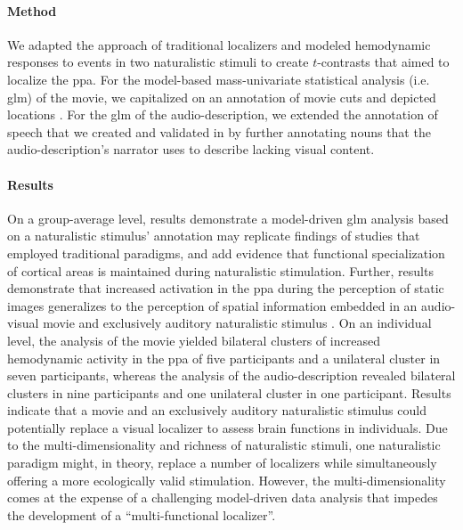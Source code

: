 \paragraph{Method}

We adapted the approach of traditional localizers and modeled hemodynamic
responses to events in two naturalistic stimuli to create $t$-contrasts that
aimed to localize the \ac{ppa}.
For the model-based mass-univariate statistical analysis (i.e. \ac{glm}) of the
movie, we capitalized on an annotation of movie cuts and depicted locations
\citep{haeusler2016cutanno}.
For the \ac{glm} of the audio-description, we extended the annotation of speech
that we created and validated in \citep{haeusler2021speechanno} by further
annotating nouns that the audio-description's narrator uses to describe lacking
visual content.


\paragraph{Results}

On a group-average level, results demonstrate a model-driven \ac{glm} analysis
based on a naturalistic stimulus' annotation may replicate findings of studies
that employed traditional paradigms, and add evidence
\citep[cf.][]{bartels2004mapping} that functional specialization of cortical
areas is maintained during naturalistic stimulation.
Further, results demonstrate that increased activation in the \ac{ppa} during
the perception of static images generalizes to the perception of spatial
information embedded in an audio-visual movie and exclusively auditory
naturalistic stimulus \citep{haeusler2022processing}.
On an individual level, the analysis of the movie yielded bilateral clusters of
increased hemodynamic activity in the \ac{ppa} of five participants and a
unilateral cluster in seven participants, whereas the analysis of the
audio-description revealed bilateral clusters in nine participants and one
unilateral cluster in one participant.
Results indicate that a movie and an exclusively auditory naturalistic stimulus
could potentially replace a visual localizer to assess brain functions in
individuals.
%
Due to the multi-dimensionality and richness of naturalistic stimuli, one
naturalistic paradigm might, in theory, replace a number of localizers while
simultaneously offering a more ecologically valid stimulation.
%
However, the multi-dimensionality comes at the expense of a challenging
model-driven data analysis that impedes the development of a ``multi-functional
localizer''.


